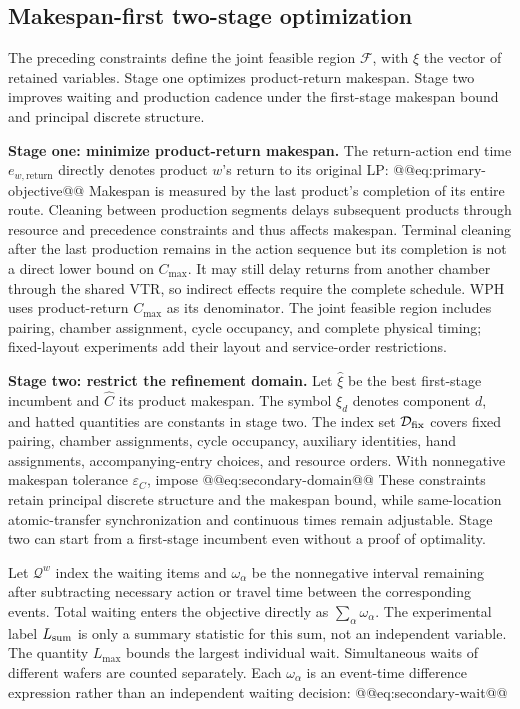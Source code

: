 \subsection{Makespan-first two-stage optimization}
\label{sec:model-objective-en}

The preceding constraints define the joint feasible region $\mathcal F$, with $\xi$ the vector of retained variables. Stage one optimizes product-return makespan. Stage two improves waiting and production cadence under the first-stage makespan bound and principal discrete structure.

\noindent\textbf{Stage one: minimize product-return makespan.}
The return-action end time $e_{w,\mathrm{return}}$ directly denotes product $w$'s return to its original LP:
@@eq:primary-objective@@
Makespan is measured by the last product's completion of its entire route. Cleaning between production segments delays subsequent products through resource and precedence constraints and thus affects makespan. Terminal cleaning after the last production remains in the action sequence but its completion is not a direct lower bound on $C_{\max}$. It may still delay returns from another chamber through the shared VTR, so indirect effects require the complete schedule. WPH uses product-return $C_{\max}$ as its denominator. The joint feasible region includes pairing, chamber assignment, cycle occupancy, and complete physical timing; fixed-layout experiments add their layout and service-order restrictions.

\noindent\textbf{Stage two: restrict the refinement domain.}
Let $\widehat\xi$ be the best first-stage incumbent and $\widehat C$ its product makespan. The symbol $\xi_d$ denotes component $d$, and hatted quantities are constants in stage two. The index set $\mathcal D_{\rm fix}$ covers fixed pairing, chamber assignments, cycle occupancy, auxiliary identities, hand assignments, accompanying-entry choices, and resource orders. With nonnegative makespan tolerance $\varepsilon_C$, impose
@@eq:secondary-domain@@
These constraints retain principal discrete structure and the makespan bound, while same-location atomic-transfer synchronization and continuous times remain adjustable. Stage two can start from a first-stage incumbent even without a proof of optimality.

Let $\mathcal Q^w$ index the waiting items and $\omega_\alpha$ be the nonnegative interval remaining after subtracting necessary action or travel time between the corresponding events. Total waiting enters the objective directly as $\sum_\alpha\omega_\alpha$. The experimental label $L_{\rm sum}$ is only a summary statistic for this sum, not an independent variable. The quantity $L_{\max}$ bounds the largest individual wait. Simultaneous waits of different wafers are counted separately. Each $\omega_\alpha$ is an event-time difference expression rather than an independent waiting decision:
@@eq:secondary-wait@@

